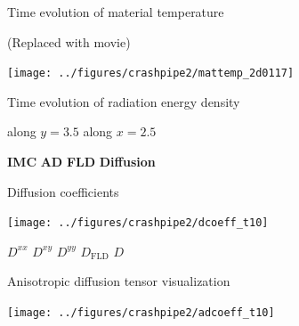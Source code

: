 \documentclass{beamer}
\begin{document}
\begin{frame}{Time evolution of material temperature}
\begin{center}
  {\tiny (Replaced with movie)}

  \texttt{[image: ../figures/crashpipe2/mattemp\_2d0117]}
\end{center}
\end{frame}
\begin{frame}{Time evolution of radiation energy density}

  
\begin{center}
  along $y=3.5$ \qquad
  \qquad along $x=2.5$

  \textcolor[rgb]{0,0,0}{\textbf{IMC}}\quad
  \textcolor[rgb]{0.1,0.9,0.1}{\textbf{AD}}\quad
  \textcolor[rgb]{0,0,1}{\textbf{FLD}}\quad
  \textcolor[rgb]{1,0,0}{\textbf{Diffusion}}
\end{center}
\end{frame}
\begin{frame}{Diffusion coefficients}
\begin{center}
  \texttt{[image: ../figures/crashpipe2/dcoeff\_t10]}

\textcolor[rgb]{0,0,0}{$D^{xx}$}\quad
\textcolor[rgb]{1,0,.5}{$D^{xy}$}\quad
\textcolor[rgb]{0.1,0.9,0.1}{$D^{yy}$}\quad
\textcolor[rgb]{0,0,1}{$D_\text{FLD}$}\quad
  \textcolor[rgb]{1,0,0}{$D$}
\end{center}
\end{frame}
\begin{frame}{Anisotropic diffusion tensor visualization}
\begin{center}
  \texttt{[image: ../figures/crashpipe2/adcoeff\_t10]}
\end{center}
\end{frame}
\end{document}

